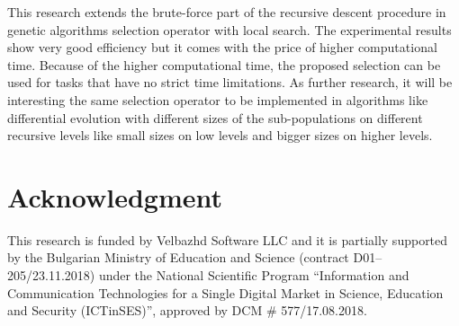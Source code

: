\documentclass[conference]{IEEEtran}
\begin{document}
This research extends the brute-force part of the recursive descent procedure in genetic algorithms selection operator with local search. The experimental results show very good efficiency but it comes with the price of higher computational time. Because of the higher computational time, the proposed selection can be used for tasks that have no strict time limitations. As further research, it will be interesting the same selection operator to be implemented in algorithms like differential evolution \cite{reddy-01} with different sizes of the sub-populations \cite{koumousis-01} on different recursive levels like small sizes on low levels and bigger sizes on higher levels. 

\section*{Acknowledgment}

This research is funded by Velbazhd Software LLC and it is partially supported by the Bulgarian Ministry of Education and Science (contract D01–205/23.11.2018) under the National Scientific Program ``Information and Communication Technologies for a Single Digital Market in Science, Education and Security (ICTinSES)'', approved by DCM \# 577/17.08.2018.
\end{document}
